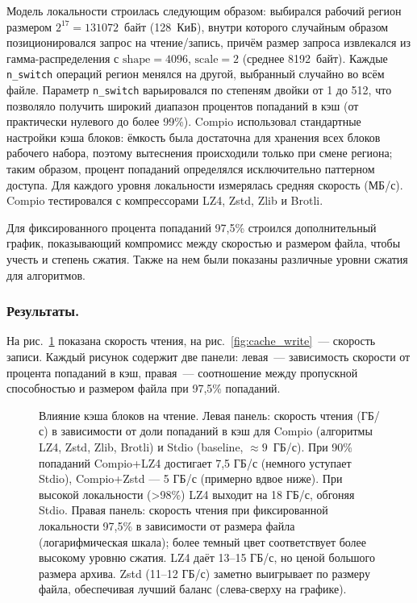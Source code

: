 Модель локальности строилась следующим образом: выбирался рабочий регион размером $2^{17}=131072$~байт (128~КиБ), внутри которого случайным образом позиционировался запрос на чтение/запись, причём размер запроса извлекался из гамма-распределения с $\mathrm{shape}=4096$, $\mathrm{scale}=2$ (среднее 8192~байт). Каждые \texttt{n\_switch} операций регион менялся на другой, выбранный случайно во всём файле. Параметр \texttt{n\_switch} варьировался по степеням двойки от 1 до 512, что позволяло получить широкий диапазон процентов попаданий в кэш (от практически нулевого до более 99\%). Compio использовал стандартные настройки кэша блоков: ёмкость была достаточна для хранения всех блоков рабочего набора, поэтому вытеснения происходили только при смене региона; таким образом, процент попаданий определялся исключительно паттерном доступа. Для каждого уровня локальности измерялась средняя скорость (МБ/с). Compio тестировался с компрессорами LZ4, Zstd, Zlib и Brotli.

Для фиксированного процента попаданий 97,5\% строился дополнительный график, показывающий компромисс между скоростью и размером файла, чтобы учесть и степень сжатия. Также на нем были показаны различные уровни сжатия для алгоритмов.

\subsubsection{Результаты.}
На рис.~\ref{fig:cache_read} показана скорость чтения, на рис.~\ref{fig:cache_write}~--- скорость записи. Каждый рисунок содержит две панели: левая~--- зависимость скорости от процента попаданий в кэш, правая~--- соотношение между пропускной способностью и размером файла при 97,5\% попаданий.

\begin{figure}[h]
\centering

\caption{Влияние кэша блоков на чтение. Левая панель: скорость чтения (ГБ/с) в зависимости от доли попаданий в кэш для Compio (алгоритмы LZ4, Zstd, Zlib, Brotli) и Stdio (baseline, $\approx9$~ГБ/с). При 90\% попаданий Compio+LZ4 достигает 7,5 ГБ/с (немного уступает Stdio), Compio+Zstd --- 5 ГБ/с (примерно вдвое ниже). При высокой локальности (>98\%) LZ4 выходит на 18 ГБ/с, обгоняя Stdio. Правая панель: скорость чтения при фиксированной локальности 97,5\% в зависимости от размера файла (логарифмическая шкала); более темный цвет соответствует более высокому уровню сжатия. LZ4 даёт 13–15 ГБ/с, но ценой большого размера архива. Zstd (11–12 ГБ/с) заметно выигрывает по размеру файла, обеспечивая лучший баланс (слева-сверху на графике).}
\label{fig:cache_read}
\end{figure}

